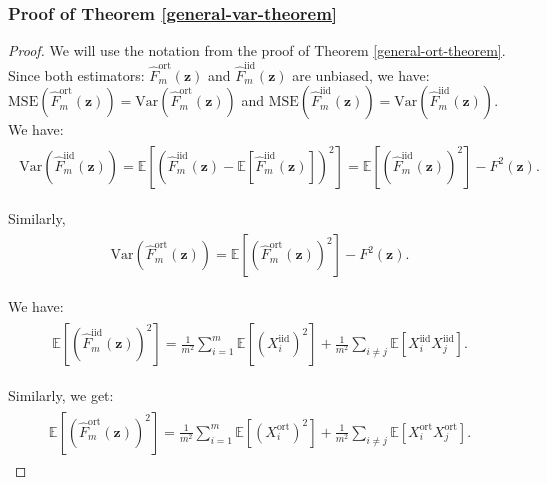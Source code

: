 \subsubsection{Proof of Theorem \ref{general-var-theorem}}
\begin{proof}
We will use the notation from the proof of Theorem \ref{general-ort-theorem}.
Since both estimators: $\widehat{F}^{\mathrm{ort}}_{m}(\mathbf{z})$ and
$\widehat{F}^{\mathrm{iid}}_{m}(\mathbf{z})$ are unbiased, we have:
$\mathrm{MSE}(\widehat{F}^{\mathrm{ort}}_{m}(\mathbf{z})) = \mathrm{Var}(\widehat{F}^{\mathrm{ort}}_{m}(\mathbf{z}))$ and
$\mathrm{MSE}(\widehat{F}^{\mathrm{iid}}_{m}(\mathbf{z})) = \mathrm{Var}(\widehat{F}^{\mathrm{iid}}_{m}(\mathbf{z}))$.
We have:
\begin{align}
\begin{split}
\mathrm{Var}(\widehat{F}^{\mathrm{iid}}_{m}(\mathbf{z})) = 
\mathbb{E}[(\widehat{F}^{\mathrm{iid}}_{m}(\mathbf{z})-\mathbb{E}[\widehat{F}^{\mathrm{iid}}_{m}(\mathbf{z})])^{2}] =
\mathbb{E}[(\widehat{F}^{\mathrm{iid}}_{m}(\mathbf{z}))^{2}]-
F^{2}(\mathbf{z}).
\end{split}
\end{align}

Similarly,
\begin{align}
\begin{split}
\mathrm{Var}(\widehat{F}^{\mathrm{ort}}_{m}(\mathbf{z})) = 
\mathbb{E}[(\widehat{F}^{\mathrm{ort}}_{m}(\mathbf{z}))^{2}]-
F^{2}(\mathbf{z}).
\end{split}
\end{align}

We have: 
\begin{align}
\begin{split}
\mathbb{E}[(\widehat{F}^{\mathrm{iid}}_{m}(\mathbf{z}))^{2}]
= \frac{1}{m^{2}}\sum_{i=1}^{m}\mathbb{E}[(X_{i}^{\mathrm{iid}})^{2}]
+\frac{1}{m^{2}}\sum_{i \neq j} \mathbb{E}[X^{\mathrm{iid}}_{i}X^{\mathrm{iid}}_{j}].
\end{split}
\end{align}

Similarly, we get:
\begin{align}
\begin{split}
\mathbb{E}[(\widehat{F}^{\mathrm{ort}}_{m}(\mathbf{z}))^{2}]
= \frac{1}{m^{2}}\sum_{i=1}^{m}\mathbb{E}[(X_{i}^{\mathrm{ort}})^{2}]
+\frac{1}{m^{2}}\sum_{i \neq j} \mathbb{E}[X^{\mathrm{ort}}_{i}X^{\mathrm{ort}}_{j}].
\end{split}
\end{align}


\end{proof}
